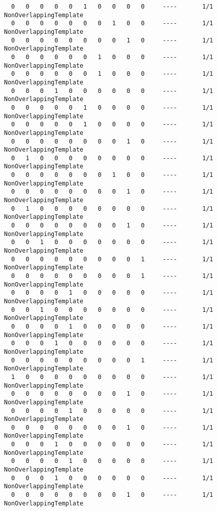 \begin{code}
\begin{verbatim}
  0   0   0   0   0   1   0   0   0   0     ----       1/1       NonOverlappingTemplate
  0   0   0   0   0   0   0   1   0   0     ----       1/1       NonOverlappingTemplate
  0   0   0   0   0   0   0   0   1   0     ----       1/1       NonOverlappingTemplate
  0   0   0   0   0   0   1   0   0   0     ----       1/1       NonOverlappingTemplate
  0   0   0   0   0   0   1   0   0   0     ----       1/1       NonOverlappingTemplate
  0   0   0   1   0   0   0   0   0   0     ----       1/1       NonOverlappingTemplate
  0   0   0   0   0   1   0   0   0   0     ----       1/1       NonOverlappingTemplate
  0   0   0   0   0   1   0   0   0   0     ----       1/1       NonOverlappingTemplate
  0   0   0   0   0   0   0   0   1   0     ----       1/1       NonOverlappingTemplate
  0   1   0   0   0   0   0   0   0   0     ----       1/1       NonOverlappingTemplate
  0   0   0   0   0   0   0   1   0   0     ----       1/1       NonOverlappingTemplate
  0   0   0   0   0   0   0   0   1   0     ----       1/1       NonOverlappingTemplate
  0   1   0   0   0   0   0   0   0   0     ----       1/1       NonOverlappingTemplate
  0   0   0   0   0   0   0   0   1   0     ----       1/1       NonOverlappingTemplate
  0   0   1   0   0   0   0   0   0   0     ----       1/1       NonOverlappingTemplate
  0   0   0   0   0   0   0   0   0   1     ----       1/1       NonOverlappingTemplate
  0   0   0   0   0   0   0   0   0   1     ----       1/1       NonOverlappingTemplate
  0   0   0   0   1   0   0   0   0   0     ----       1/1       NonOverlappingTemplate
  0   0   1   0   0   0   0   0   0   0     ----       1/1       NonOverlappingTemplate
  0   0   0   0   1   0   0   0   0   0     ----       1/1       NonOverlappingTemplate
  0   0   0   1   0   0   0   0   0   0     ----       1/1       NonOverlappingTemplate
  0   0   0   0   0   0   0   0   0   1     ----       1/1       NonOverlappingTemplate
  1   0   0   0   0   0   0   0   0   0     ----       1/1       NonOverlappingTemplate
  0   0   0   0   0   0   0   0   1   0     ----       1/1       NonOverlappingTemplate
  0   0   0   0   1   0   0   0   0   0     ----       1/1       NonOverlappingTemplate
  0   0   0   0   0   0   0   0   1   0     ----       1/1       NonOverlappingTemplate
  0   0   0   1   0   0   0   0   0   0     ----       1/1       NonOverlappingTemplate
  0   0   0   0   1   0   0   0   0   0     ----       1/1       NonOverlappingTemplate
  0   0   0   1   0   0   0   0   0   0     ----       1/1       NonOverlappingTemplate
  0   0   0   0   0   0   0   0   1   0     ----       1/1       NonOverlappingTemplate

\end{verbatim}
\end{code}
